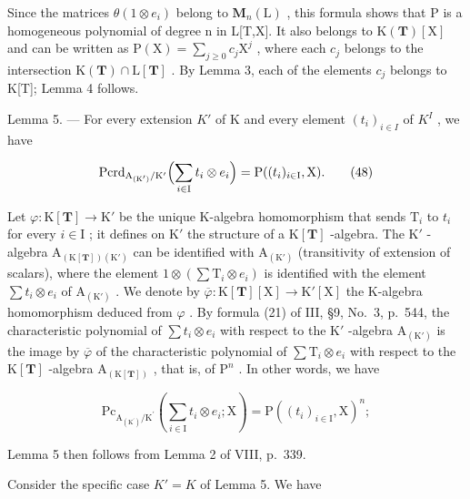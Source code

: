 Since the matrices \(\theta(1\otimes e_{i})\) belong to \(\mathbf{M}_{n}(\mathrm{L})\) , this formula shows that P is a homogeneous polynomial of degree n in L{[}T,X{]}. It also belongs to \(\mathrm{K}(\mathbf{T})[\mathrm{X}]\) and can be written as \(\mathrm{P}(\mathrm{X})=\sum_{j\geqslant0}c_{j}\mathrm{X}^{j}\) , where each \(c_{j}\) belongs to the intersection \(\mathrm{K}(\mathbf{T})\cap\mathrm{L}[\mathbf{T}]\) . By Lemma 3, each of the elements \(c_{j}\) belongs to K{[}T{]}; Lemma 4 follows.

Lemma 5. --- For every extension \(K'\) of K and every element \((t_{i})_{i\in I}\) of \(K^{I}\) , we have

\[
\mathrm{Pcrd} _ {\mathrm{A} _ {(\mathrm{K} ^ {\prime})} / \mathrm{K} ^ {\prime}} \Bigl (\sum_ {i \in \mathrm{I}} t _ {i} \otimes e _ {i} \Bigr) = \mathrm{P} ((t _ {i}) _ {i \in \mathrm{I}}, \mathrm{X}).\tag{48}
\]

Let \(\varphi : \mathrm{K}[\mathbf{T}] \to \mathrm{K}'\) be the unique K-algebra homomorphism that sends \(\mathrm{T}_i\) to \(t_i\) for every \(i \in \mathrm{I}\) ; it defines on \(\mathrm{K}'\) the structure of a \(\mathrm{K}[\mathbf{T}]\) -algebra. The \(\mathrm{K}'\) -algebra \(\mathrm{A}_{(\mathrm{K}[\mathbf{T}])(\mathrm{K}')}\) can be identified with \(\mathrm{A}_{(\mathrm{K}')}\) (transitivity of extension of scalars), where the element \(1 \otimes (\sum \mathrm{T}_i \otimes e_i)\) is identified with the element \(\sum t_i \otimes e_i\) of \(\mathrm{A}_{(\mathrm{K}')}\) . We denote by \(\overline{\varphi}: \mathrm{K}[\mathbf{T}][\mathrm{X}] \to \mathrm{K}'[\mathrm{X}]\) the K-algebra homomorphism deduced from \(\varphi\) . By formula (21) of III, §9, No.~3, p.~544, the characteristic polynomial of \(\sum t_i \otimes e_i\) with respect to the \(\mathrm{K}'\) -algebra \(\mathrm{A}_{(\mathrm{K}')}\) is the image by \(\overline{\varphi}\) of the characteristic polynomial of \(\sum \mathrm{T}_i \otimes e_i\) with respect to the \(\mathrm{K}[\mathbf{T}]\) -algebra \(\mathrm{A}_{(\mathrm{K}[\mathbf{T}])}\) , that is, of \(\mathrm{P}^n\) . In other words, we have

\[
\mathrm{Pc} _ {\mathrm{A} _ {(\mathrm{K} ^ {\prime})} / \mathrm{K} ^ {\prime}} \left(\sum_ {i \in \mathrm{I}} t _ {i} \otimes e _ {i}; \mathrm{X}\right) = \mathrm{P} ((t _ {i}) _ {i \in \mathrm{I}}, \mathrm{X}) ^ {n};\tag{49}
\]

Lemma 5 then follows from Lemma 2 of VIII, p.~339.

Consider the specific case \(K' = K\) of Lemma 5. We have

